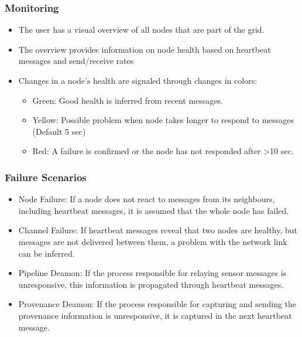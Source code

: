 \subsubsection{Monitoring}
\begin{itemize}
  \item The user has a visual overview of all nodes that are part of the grid.
  \item The overview provides information on node health based on heartbeat messages and send/receive rates
  \item Changes in a node's health are signaled through changes in colors:
	\begin{itemize}
	  \item Green: Good health is inferred from recent messages.
	  \item Yellow: Possible problem when node takes longer to respond to messages (Default 5 sec)
	  \item Red: A failure is confirmed or the node has not responded after >10 sec.
	\end{itemize}
\end{itemize}

\subsubsection{Failure Scenarios}
\begin{itemize}
  \item Node Failure: If a node does not react to messages from its neighbours, including heartbeat messages, it is assumed that the whole node has failed. 
  \item Channel Failure: If heartbeat messages reveal that two nodes are healthy, but messages are not delivered between them, a problem with the network link can be inferred.
  \item Pipeline Deamon: If the process responsible for relaying sensor messages is unresponsive, this information is propagated through heartbeat messages.
  \item Provenance Deamon: If the process responsible for capturing and sending the provenance information is unresponsive, it is captured in the next heartbeat message.
\end{itemize}

